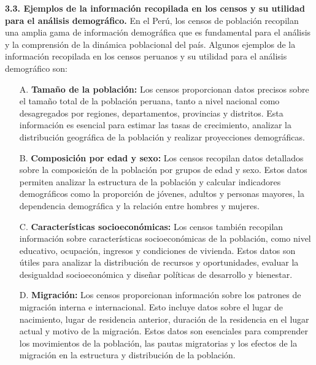 \documentclass[8pt,a4paper]{beamer}
\begin{document}
{\begin{frame}{}
\begin{block}{\textbf{3.3. Ejemplos de la información recopilada en los censos y su utilidad para el análisis demográfico.}}
\justifying
En el Perú, los censos de población recopilan una amplia gama de información demográfica que es fundamental para el análisis y la comprensión de la dinámica poblacional del país. Algunos ejemplos de la información recopilada en los censos peruanos y su utilidad para el análisis demográfico son:
\begin{enumerate}
\justifying
\item[A.] \textbf{Tamaño de la población:} Los censos proporcionan datos precisos sobre el tamaño total de la población peruana, tanto a nivel nacional como desagregados por regiones, departamentos, provincias y distritos. Esta información es esencial para estimar las tasas de crecimiento, analizar la distribución geográfica de la población y realizar proyecciones demográficas.

\item[B.] \textbf{Composición por edad y sexo:} Los censos recopilan datos detallados sobre la composición de la población por grupos de edad y sexo. Estos datos permiten analizar la estructura de la población y calcular indicadores demográficos como la proporción de jóvenes, adultos y personas mayores, la dependencia demográfica y la relación entre hombres y mujeres.

\end{enumerate}
\end{block}
\end{frame}

\begin{frame}{}
\begin{block}{}
\justifying
\begin{enumerate}
\justifying
\item[C.] \textbf{Características socioeconómicas:} Los censos también recopilan información sobre características socioeconómicas de la población, como nivel educativo, ocupación, ingresos y condiciones de vivienda. Estos datos son útiles para analizar la distribución de recursos y oportunidades, evaluar la desigualdad socioeconómica y diseñar políticas de desarrollo y bienestar.
\item[D.] \textbf{Migración:} Los censos proporcionan información sobre los patrones de migración interna e internacional. Esto incluye datos sobre el lugar de nacimiento, lugar de residencia anterior, duración de la residencia en el lugar actual y motivo de la migración. Estos datos son esenciales para comprender los movimientos de la población, las pautas migratorias y los efectos de la migración en la estructura y distribución de la población.


\end{enumerate}
\end{block}
\end{frame}}
\end{document}
